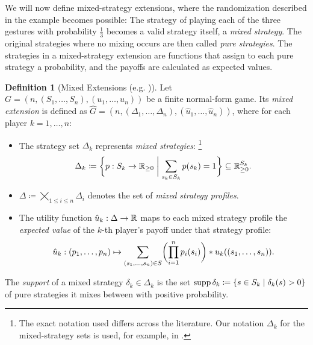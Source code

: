\documentclass[a4paper,DIV=11,abstracton,twoside=semi]{scrreprt}
\newcommand{\Rp}{\mathbb{R}_{\geq 0}}
\theoremstyle{definition}
\newtheorem{defn}[thm]{Definition} %
\begin{document}
    We will now define mixed-strategy extensions, where the randomization described in the example becomes possible: The strategy of playing each of the three gestures with probability $\frac{1}{3}$ becomes a valid strategy itself, a \emph{mixed strategy}. The original strategies where no mixing occurs are then called \emph{pure strategies}. The strategies in a mixed-strategy extension are functions that assign to each pure strategy a probability, and the payoffs are calculated as expected values.

    \begin{defn}[Mixed Extensions (e.g. \cite{bib:matsumotoGameTheory})]
        Let $G = (n{,}(S_1{,\dots,}S_n){, }(u_1{,\dots,}u_n))$ be a finite normal-form game.
        Its \emph{mixed extension} is defined as $\hat{G} = (n, (\Delta_1, \dots, \Delta_n), (\hat{u}_1, \dots, \hat{u}_n))$,
        where for each player $k = 1,\dots,n$:
        \begin{itemize}
            \item 
            The strategy set $\Delta_k$ represents \emph{mixed strategies}:
            \footnote{The exact notation used differs across the literature. Our notation $\Delta_k$ for the mixed-strategy sets is used, for example, in \cite{bib:quantPropernessProtectiveness}.}
            \begin{gather*} 
                \Delta_k \coloneqq \biggset{ p : S_k \to \Rp \biggmid \sum_{s_k \in S_k} p(s_k) = 1 } \subseteq \Rp^{S_k}.
            \end{gather*} 
            
            \item $\Delta \coloneqq \bigtimes\limits_{1\leq i \leq n} \Delta_i$ denotes the set of \emph{mixed strategy profiles}.
            
            \item
            The utility function $\hat{u}_k: \Delta \to \mathbb{R}$ maps to each mixed strategy profile the \emph{expected value} of the $k$-th player's payoff under that strategy profile:
            \begin{gather}
                \hat{u}_k: 
                (p_1, \dots, p_n) 
                \mapsto
                \sum_{(s_1, \dots, s_n) \in S} \biggl(\prod_{i=1}^{n} p_i(s_i)\biggr) * u_k( (s_1, \dots, s_n) ).
                \label{eq:mixedStrategyUtility}
            \end{gather}
        \end{itemize}
        The \emph{support} of a mixed strategy $\delta_k \in \Delta_k$  is the set $\operatorname{supp} \delta_k \coloneqq \{s \in S_k \mid \delta_k(s) > 0\}$ of pure strategies it mixes between with positive probability.
    \end{defn}
\end{document}
